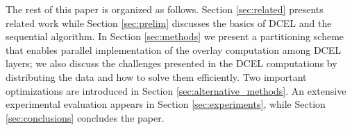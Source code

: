 The rest of this paper is organized as follows. Section \ref{sec:related} presents related work while Section \ref{sec:prelim} discusses the basics of DCEL and the sequential algorithm.
In Section \ref{sec:methods} we present a partitioning scheme that enables parallel implementation of the overlay computation among DCEL layers; we also discuss the challenges presented in the DCEL computations by distributing the data and how to solve them efficiently. 
Two important optimizations are introduced in Section \ref{sec:alternative_methods}.
An extensive experimental evaluation appears in Section \ref{sec:experiments}, while Section \ref{sec:conclusions} concludes the paper.


